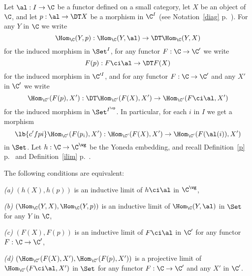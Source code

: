 \documentclass[12pt]{article}
\theoremstyle{remark}
\theoremstyle{definition}
\begin{document}

\begin{s} 
Let $\al:I\to\C$ be a functor defined on a small category, let $X$ be an object of $\C$, and let $p:\al\to\DT X$ be a morphism in $\C^I$ (see Notation~\ref{diag} p.~). For any $Y$ in $\C$ we write 
$$
\Hom_\C(Y,p):\Hom_\C(Y,\al)\to\DT\Hom_\C(Y,X)
$$ 
for the induced morphism in $\Set^I$, for any functor $F:\C\to\C'$ we write 
$$
F(p):F\ci\al\to\DT F(X)
$$ 
for the induced morphism in $\C'^I$, and for any functor $F:\C\to\C'$ and any $X'$ in $\C'$ we write 
$$
\Hom_{\C'}(F(p),X'):\DT\Hom_{\C'}(F(X),X')\to\Hom_{\C'}(F\ci\al,X')
$$ 
for the induced morphism in $\Set^{I^{\op}}$. In particular, for each $i$ in $I$ we get a morphism 
\begin{equation}\lb{c'fpi}
\Hom_{\C'}(F(p_i),X'):\Hom_{\C'}(F(X),X')\to\Hom_{\C'}(F(\al(i)),X')
\end{equation}
in $\Set$. Let $h:\C\to\C^\wg$ be the Yoneda embedding, and recall Definition~\ref{p} p.~ and Definition~\ref{ilim} p.~.

\begin{prop}
The following conditions are equivalent:

\nn\emph{(a)} $(h(X),h(p))$ is an inductive limit of $h\ci\al$ in $\C^\wg$,

\nn\emph{(b)} $(\Hom_\C(Y,X),\Hom_\C(Y,p))$ is an inductive limit of $\Hom_\C(Y,\al)$ in $\Set$ for any $Y$ in $\C$,

\nn\emph{(c)} $(F(X),F(p))$ is an inductive limit of $F\ci\al$ in $\C'$ for any functor $F:\C\to\C'$,

\nn\emph{(d)} $(\Hom_{\C'}(F(X),X'),\Hom_{\C'}(F(p),X'))$ is a projective limit of $\Hom_{\C'}(F\ci\al,X')$ in $\Set$ for any functor $F:\C\to\C'$ and any $X'$ in $\C'$.
\end{prop}


\end{s}
\end{document}
